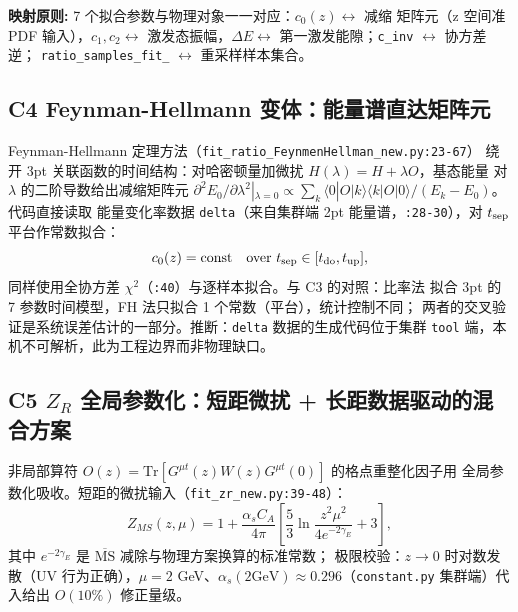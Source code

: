 \documentclass[UTF8]{ctexart}
\begin{document}
\begin{mapbox}
\textbf{映射原则:} 7 个拟合参数与物理对象一一对应：$c_0(z)\leftrightarrow$ 减缩
矩阵元（z 空间准 PDF 输入），$c_1,c_2\leftrightarrow$ 激发态振幅，$\Delta E
\leftrightarrow$ 第一激发能隙；\texttt{c\_inv} $\leftrightarrow$ 协方差逆；
\texttt{ratio\_samples\_fit\_} $\leftrightarrow$ 重采样样本集合。
\end{mapbox}

\subsection{C4 Feynman-Hellmann 变体：能量谱直达矩阵元}

Feynman-Hellmann 定理方法（\texttt{fit\_ratio\_FeynmenHellman\_new.py:23-67}）
绕开 3pt 关联函数的时间结构：对哈密顿量加微扰 $H(\lambda)=H+\lambda O$，基态能量
对 $\lambda$ 的二阶导数给出减缩矩阵元 $\partial^2 E_0/\partial\lambda^2|_{\lambda=0}
\propto \sum_k \langle 0|O|k\rangle\langle k|O|0\rangle/(E_k-E_0)$。代码直接读取
能量变化率数据 \texttt{delta}（来自集群端 2pt 能量谱，\texttt{:28-30}），对
$t_{\rm sep}$ 平台作常数拟合：
\begin{equation}\label{eq:fh}
c_0(z) = \text{const}\quad \text{over } t_{\rm sep}\in[t_{\rm do},t_{\rm up}],
\end{equation}
同样使用全协方差 $\chi^2$（\texttt{:40}）与逐样本拟合。与 C3 的对照：比率法
拟合 3pt 的 7 参数时间模型，FH 法只拟合 1 个常数（平台），统计控制不同；
两者的交叉验证是系统误差估计的一部分。\textcolor{warn}{推断}：\texttt{delta}
数据的生成代码位于集群 \texttt{tool} 端，本机不可解析，此为工程边界而非物理缺口。

\subsection{C5 $Z_R$ 全局参数化：短距微扰 + 长距数据驱动的混合方案}

非局部算符 $O(z)=\mathrm{Tr}[G^{\mu t}(z)W(z)G^{\mu t}(0)]$ 的格点重整化因子用
全局参数化吸收。短距的微扰输入（\texttt{fit\_zr\_new.py:39-48}）：
\begin{equation}\label{eq:zms}
Z_{MS}(z,\mu) = 1 + \frac{\alpha_s C_A}{4\pi}\left[\frac{5}{3}\ln\!\frac{z^2\mu^2}{4e^{-2\gamma_E}} + 3\right],
\end{equation}
其中 $e^{-2\gamma_E}$ 是 $\overline{\mathrm{MS}}$ 减除与物理方案换算的标准常数；
极限校验：$z\to 0$ 时对数发散（UV 行为正确），$\mu=2$ GeV、$\alpha_s(2\text{GeV})
\approx 0.296$（\texttt{constant.py} 集群端）代入给出 $O(10\%)$ 修正量级。
\end{document}
